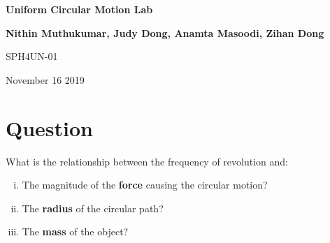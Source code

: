 \documentclass{article}[12pt]
\begin{document}
\begin{titlepage}
   \begin{center}
       \vspace*{1cm}
 
       \textbf{Uniform Circular Motion Lab}
 
       \vspace{0.5cm}
 
       \vspace{1.5cm}
 
       \textbf{Nithin Muthukumar, Judy Dong, Anamta Masoodi, Zihan Dong}
 
       \vspace{0.8cm}
 
       SPH4UN-01
       \vspace{0.2cm}
       
       November 16 2019
 
   \end{center}
\end{titlepage}

\pagestyle{plain}
\section*{Question}
What is the relationship between the frequency of revolution and:
\begin{enumerate}[i.]
\item The magnitude of the {\bf force} causing the circular motion?
\item The {\bf radius} of the circular path?
\item The {\bf mass} of the object?
\end{enumerate}
\end{document}
